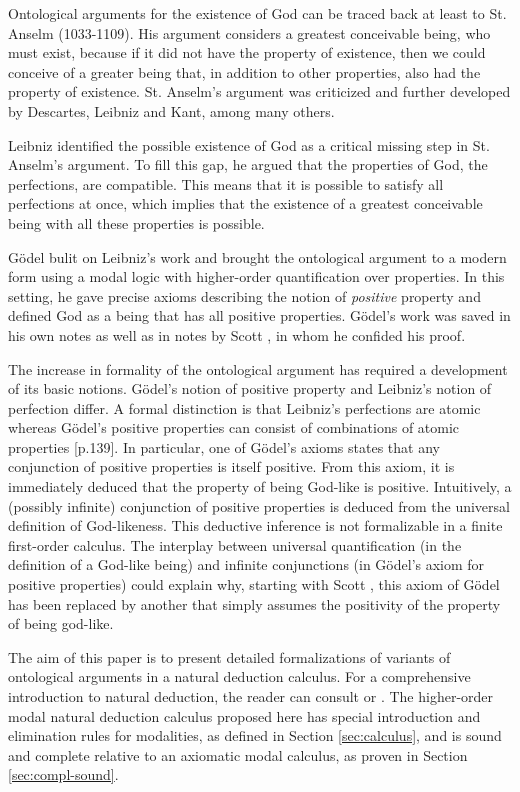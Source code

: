\documentclass[smallextended]{svjour3}
\begin{document}
Ontological arguments for the existence of God can be traced back at least to St. Anselm (1033-1109). His argument considers a greatest conceivable being, who must exist, because if it did not have the property of existence, then we could conceive of a greater being that, in addition to other properties, also had the property of existence. St. Anselm's argument was criticized and further developed by Descartes, Leibniz and Kant, among many others. 

Leibniz identified the possible existence of God as a critical missing step in St. Anselm's argument. To fill this gap, he argued that the properties of God, the perfections, are compatible. This means that it is possible to satisfy all perfections at once, which implies that the existence of a greatest conceivable being with all these properties is possible. 

G\"odel bulit on Leibniz's work \citep{adams} and brought the ontological argument to a modern form using a modal logic with higher-order quantification over properties. In this setting, he gave precise axioms describing the notion of \emph{positive} property and defined God as a being that has all positive properties. G\"odel's work was saved in his own notes \citep{Goedel} as well as in notes by Scott \citep{scott}, in whom he confided his proof. 

The increase in formality of the ontological argument has required a development of its basic notions. G\"odel's notion of positive property and Leibniz's notion of perfection differ. A formal distinction is that Leibniz's perfections are atomic whereas G\"odel's positive properties can consist of combinations of atomic properties \citep{fitting}[p.139]. In particular, one of G\"odel's axioms states that any conjunction of positive properties is itself positive. From this axiom, it is immediately deduced that the property of being God-like is positive. Intuitively, a (possibly infinite) conjunction of positive properties is deduced from the universal definition of God-likeness. This deductive inference is not formalizable in a finite first-order calculus. The interplay between universal quantification (in the definition of a God-like being) and infinite conjunctions (in G\"odel's axiom for positive properties) could explain why, starting with Scott \citep{scott}, this axiom of G\"odel has been replaced by another that simply assumes the positivity of the property of being god-like. 

The aim of this paper is to present detailed formalizations of variants of ontological arguments in a natural deduction calculus. For a comprehensive introduction to natural deduction, the reader can consult \citep{prawitz} or \citep{gabbay}. The higher-order modal natural deduction calculus proposed here has special introduction and elimination rules for modalities, as defined in Section \ref{sec:calculus}, and is sound and complete relative to an axiomatic modal calculus, as proven in Section \ref{sec:compl-sound}.
\end{document}
